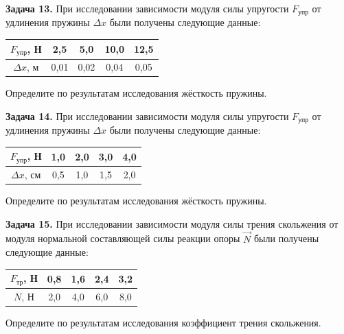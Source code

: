 \begin{taskbasic}[code={\label{task:dem26_v13_n2}}]
\textbf{Задача 13.} При исследовании зависимости модуля силы упругости $F_{\text{упр}}$ от удлинения пружины $\Delta x$ были получены следующие данные:
\begin{center}
\begin{tabular}{|c|c|c|c|c|}
\hline
$F_{\text{упр}}$, Н & 2,5 & 5,0 & 10,0 & 12,5 \\ \hline
$\Delta x$, м & 0,01 & 0,02 & 0,04 & 0,05 \\ \hline
\end{tabular}
\end{center}
Определите по результатам исследования жёсткость пружины.

\end{taskbasic}

\begin{taskbasic}[code={\label{task:dem26_v14_n2}}]
\textbf{Задача 14.} При исследовании зависимости модуля силы упругости $F_{\text{упр}}$ от удлинения пружины $\Delta x$ были получены следующие данные:
\begin{center}
\begin{tabular}{|c|c|c|c|c|}
\hline
$F_{\text{упр}}$, Н & 1,0 & 2,0 & 3,0 & 4,0 \\ \hline
$\Delta x$, см & 0,5 & 1,0 & 1,5 & 2,0 \\ \hline
\end{tabular}
\end{center}
Определите по результатам исследования жёсткость пружины.

\end{taskbasic}

\begin{taskbasic}[code={\label{task:dem26_v15_n2}}]
\textbf{Задача 15.} При исследовании зависимости модуля силы трения скольжения от модуля нормальной составляющей силы реакции опоры $\vec{N}$ были получены следующие данные:
\begin{center}
\begin{tabular}{|c|c|c|c|c|}
\hline
$F_{\text{тр}}$, Н & 0,8 & 1,6 & 2,4 & 3,2 \\ \hline
$N$, Н & 2,0 & 4,0 & 6,0 & 8,0 \\ \hline
\end{tabular}
\end{center}
Определите по результатам исследования коэффициент трения скольжения.

\end{taskbasic}

